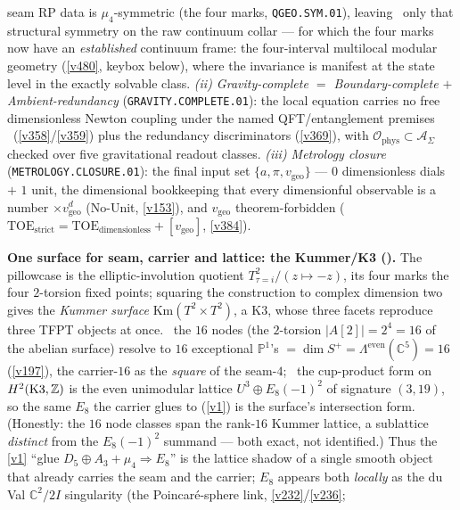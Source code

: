 seam RP data is $\mu_4$-symmetric (the four marks, \texttt{QGEO.SYM.01}), leaving \mO\ only that structural
symmetry on the raw continuum collar --- for which the four marks now have an \emph{established} continuum frame:
the four-interval multilocal modular geometry (\vref{v480}, keybox below), where the invariance is manifest at the
state level in the exactly solvable class.
\emph{(ii) Gravity-complete $=$ Boundary-complete $+$ Ambient-redundancy} (\texttt{GRAVITY.COMPLETE.01}): the local
equation carries no free dimensionless Newton coupling under the named QFT/entanglement premises \mC\ (\vref{v358}/\vref{v359}) plus the redundancy discriminators (\vref{v369}), with
$\mathcal O_{\mathrm{phys}}\subset\mathcal A_\Sigma$ checked over five gravitational readout classes.
\emph{(iii) Metrology closure} (\texttt{METROLOGY.CLOSURE.01}): the final input set $\{a,\pi,v_{\mathrm{geo}}\}$ ---
$0$ dimensionless dials $+$ $1$ unit, the dimensional bookkeeping that every dimensionful observable is a number
$\times v_{\mathrm{geo}}^d$ (No-Unit, \vref{v153}), and $v_{\mathrm{geo}}$ theorem-forbidden
($\mathrm{TOE}_{\mathrm{strict}}{=}\mathrm{TOE}_{\mathrm{dimensionless}}{+}[v_{\mathrm{geo}}]$, \vref{v384}).
\par\smallskip\noindent\textbf{One surface for seam, carrier and lattice: the Kummer/K3
().} The pillowcase is the elliptic-involution quotient
$T^2_{\tau=i}/(z{\mapsto}{-}z)$, its four marks the four $2$-torsion fixed points; squaring the construction
to complex dimension two gives the \emph{Kummer surface} $\mathrm{Km}(T^2{\times}T^2)$, a K3, whose three
facets reproduce three TFPT objects at once. \mE\ the $16$ nodes (the $2$-torsion $|A[2]|{=}2^4{=}16$ of the
abelian surface) resolve to $16$ exceptional $\mathbb P^1$'s $=\dim S^+=\Lambda^{\mathrm{even}}(\mathbb
C^5)=16$ (\vref{v197}), the carrier-$16$ as the \emph{square} of the seam-$4$; \mE\ the cup-product form on
$H^2(\mathrm{K3},\mathbb Z)$ is the even unimodular lattice $U^3\oplus E_8({-}1)^2$ of signature $(3,19)$, so the
same $E_8$ the carrier glues to (\vref{v1}) is the surface's intersection form. (Honestly: the $16$ node
classes span the rank-$16$ Kummer lattice, a sublattice \emph{distinct} from the $E_8({-}1)^2$ summand ---
both exact, not identified.) Thus the \vref{v1} ``glue $D_5{\oplus}A_3{+}\mu_4{\Rightarrow}E_8$'' is the
lattice shadow of a single smooth object that already carries the seam and the carrier; $E_8$ appears both
\emph{locally} as the du Val $\mathbb C^2/2I$ singularity (the Poincar\'e-sphere link, \vref{v232}/\vref{v236};
